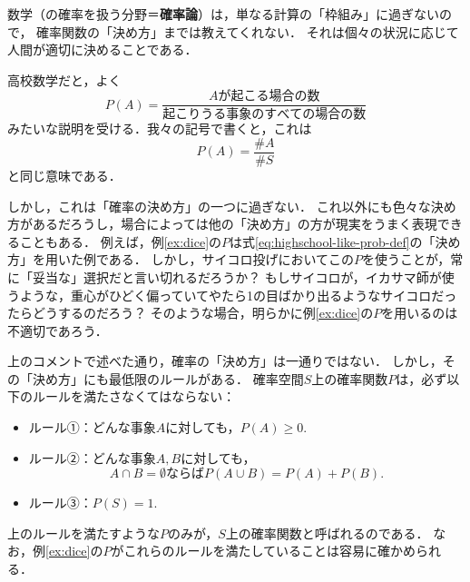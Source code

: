 \documentclass[a5j, uplatex, dvipdfmx]{jsbook}
\makeatletter
\newcommand{\ind}[2]{\textbf{#1}\index{#2@#1}}
\makeatother
\begin{document}
    \begin{rem}{}{}
        数学（の確率を扱う分野＝\ind{確率論}{かくりつろん}）は，単なる計算の「枠組み」に過ぎないので，
        確率関数の「決め方」までは教えてくれない．
        それは個々の状況に応じて人間が適切に決めることである．
        
        高校数学だと，よく
        \begin{equation}
            P(A) = \frac{Aが起こる場合の数}{起こりうる事象のすべての場合の数} \label{eq:highschool-like-prob-def}
        \end{equation}
        みたいな説明を受ける．我々の記号で書くと，これは
        \begin{equation}
            P(A) = \frac{\#A}{\#S}
        \end{equation}
        と同じ意味である．

        しかし，これは「確率の決め方」の一つに過ぎない．
        これ以外にも色々な決め方があるだろうし，場合によっては他の「決め方」の方が現実をうまく表現できることもある．
        例えば，例\ref{ex:dice}の$P$は式\eqref{eq:highschool-like-prob-def}の「決め方」を用いた例である．
        しかし，サイコロ投げにおいてこの$P$を使うことが，常に「妥当な」選択だと言い切れるだろうか？
        もしサイコロが，イカサマ師が使うような，重心がひどく偏っていてやたら1の目ばかり出るようなサイコロだったらどうするのだろう？
        そのような場合，明らかに例\ref{ex:dice}の$P$を用いるのは不適切であろう．
    \end{rem}

    上のコメントで述べた通り，確率の「決め方」は一通りではない．
    しかし，その「決め方」にも最低限のルールがある．
    確率空間$S$上の確率関数$P$は，必ず以下のルールを満たさなくてはならない：
    \begin{itemize}
        \item ルール①：どんな事象$A$に対しても，$P(A)\geq 0.$
        \item ルール②：どんな事象$A,B$に対しても，
        \begin{equation*}
            A\cap B = \emptyset ならばP(A\cup B)=P(A)+P(B).
        \end{equation*}
        \item ルール③：$P(S)=1.$
    \end{itemize}

    上のルールを満たすような$P$のみが，$S$上の確率関数と呼ばれるのである．
    なお，例\ref{ex:dice}の$P$がこれらのルールを満たしていることは容易に確かめられる．
\end{document}
